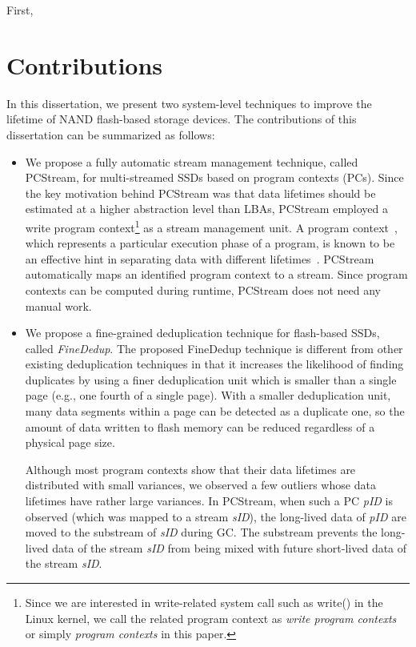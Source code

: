 First, 
\section{Contributions}
In this dissertation, we present two system-level techniques to improve the 
lifetime of NAND flash-based storage devices. 
The contributions of this dissertation can be summarized as follows:

\begin{itemize}
\item 
We propose a fully automatic stream management technique, called \textsf{\small PCStream}, 
for multi-streamed SSDs based on program contexts (PCs).
Since the key motivation behind \textsf{\small PCStream} was 
that data lifetimes should be estimated at a higher abstraction level than LBAs, 
\textsf{\small PCStream} employed a write program context\footnote{Since we are interested in write-related 
system call such as write() in the Linux kernel, 
we call the related program context as 
{\it write program contexts} or simply {\it program contexts} in this paper.}  
as a stream management unit.
A program context~\cite{PC, PC2}, which represents a particular execution phase of a program, 
is known to be an effective hint in separating data with different lifetimes~\cite{PCHa}.  
\textsf{\small PCStream} automatically maps an identified program context to a stream.  
Since program contexts can be computed during runtime, 
\textsf{\small PCStream} does not need any manual work.   


\item
We propose a fine-grained deduplication technique for flash-based SSDs, called \textit{FineDedup}.
The proposed FineDedup technique is different from other existing deduplication techniques
in that it increases the likelihood of finding duplicates
by using a finer deduplication unit
which is smaller than a single page (e.g., one fourth of a single page).
With a smaller deduplication unit,
many data segments within a page can be detected as a duplicate one, 
so the amount of data written to flash memory can be reduced regardless of a physical page size.


Although most program contexts show that their data lifetimes are 
distributed with small variances, we observed a few outliers 
whose data lifetimes have rather large variances.
In \textsf{\small PCStream}, 
when such a PC {\it pID} is observed (which was mapped to a stream {\it sID}), 
the long-lived data of {\it pID} are moved to the substream of {\it sID}
during GC.  
The substream prevents the long-lived data of the stream {\it sID} 
from being mixed with future short-lived data of the stream {\it sID}.

\end{itemize}

